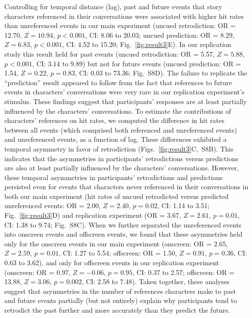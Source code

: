 \documentclass[10pt]{article}
\newcommand{\refEffectRep}{S8}
\begin{document}
Controlling for temporal distance (lag), past and future events that story characters referenced in their conversations were associated with higher hit rates than unreferenced events in our main experiment (uncued retrodiction: OR = 12.70, $Z = 10.94$, $p < 0.001$, CI: 8.06 to 20.03; uncued prediction: OR = 8.29, $Z = 6.83$, $p < 0.001$, CI: 4.52 to 15.20; Fig.~\ref{fig:result3}E). In our replication study this result held for past events (uncued retrodiction: OR = 5.57, $Z = 5.88$, $p < 0.001$, CI: 3.14 to 9.89) but not for future events (uncued prediction: OR = 1.54, $Z = 0.22$, $p = 0.83$, CI: 0.03 to 73.36; Fig.~\refEffectRep D). The failure to replicate the ``prediction'' result appeared to follow from the fact that references to future events in characters' conversations were very rare in our replication experiment's stimulus.  These findings suggest that participants' responses are at least partially influenced by the characters' conversations. To estimate the contributions of characters’ references on hit rates, we computed the difference in hit rates between all events (which comprised both referenced and unreferenced events) and unreferenced events, as a function of lag. These differences exhibited a temporal asymmetry in favor of retrodiction (Figs.~\ref{fig:result3}C,~\refEffectRep B). This indicates that the asymmetries in participants' retrodictions versus predictions are also at least partially influenced by the characters' conversations. However, these temporal asymmetries in participants' retrodictions and predictions persisted even for events that characters never referenced in their conversations in both our main experiment (hit rates of uncued retrodicted versus predicted unreferenced events: OR = 2.00, $Z = 2.40$, $p = 0.02$, CI: 1.14 to 3.51; Fig.~\ref{fig:result3}D) and replication experiment (OR = 3.67, $Z = 2.61$, $p = 0.01$, CI: 1.38 to 9.74; Fig.~\refEffectRep C). When we further separated the unreferenced events into onscreen events and offscreen events, we found that these asymmetries held only for the onscreen events in our main experiment (onscreen: OR = 2.65, $Z = 2.59$, $p = 0.01$, CI: 1.27 to 5.54; offscreen: OR = 1.50, $Z = 0.91$, $p = 0.36$, CI: 0.63 to 3.62), and only for offscreen events in our replication experiment (onscreen: OR = 0.97, $Z = -0.06$, $p = 0.95$, CI: 0.37 to 2.57; offscreen: OR = 13.88, $Z = 3.06$, $p = 0.002$, CI: 2.58 to 7.48). Taken together, these analyses suggest that asymmetries in the number of references characters make to past and future events partially (but not entirely) explain why participants tend to retrodict the past further and more accurately than they predict the future.
\end{document}
